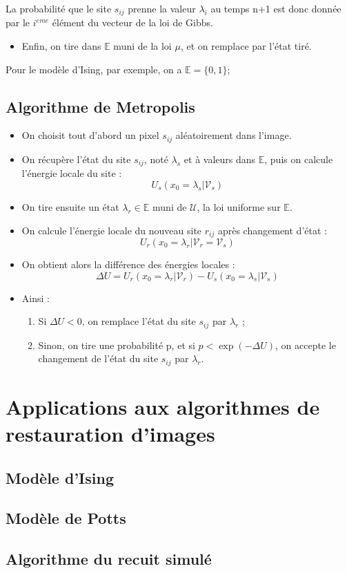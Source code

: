 \documentclass[a4paper, 12pt]{article}
\begin{document}
La probabilité que le site $s_{ij}$ prenne la valeur $\lambda_i$ au temps n+1 est donc donnée par le $i^{\grave{e}me}$ élément du vecteur de la loi de Gibbs.
\begin{itemize}
\item Enfin, on tire dans $\mathbb{E}$ muni de la loi $\mu$, et on remplace par l'état tiré.
\end{itemize}
Pour le modèle d'Ising, par exemple, on a $\mathbb{E} =\{0,1\}$;

\subsection[Algorithme de Metropolis]{Algorithme de Metropolis}
\begin{itemize}
\item On choisit tout d'abord un pixel $s_{ij} $ aléatoirement dans l'image.
\item On récupère l'état du site $s_{ij} $, noté $\lambda_s$ et à valeurs dans $\mathbb{E}$, puis on calcule l'énergie locale du site : 
\[
  U_s(x_0=\lambda_s| \mathcal{V}_s)
\]
\item On tire ensuite un état $\lambda_r \in \mathbb{E}$ muni de $\mathcal{U}$, la loi uniforme sur $\mathbb{E}$.
\item On calcule l'énergie locale du nouveau site $r_{ij}$ après changement d'état : 
\[
  U_r(x_0=\lambda_r| \mathcal{V}_r = \mathcal{V}_s) 
\]
\item On obtient alors la différence des énergies locales : 
\[
  \Delta U = U_r(x_0=\lambda_r| \mathcal{V}_r)-U_s(x_0=\lambda_s| \mathcal{V}_s)
\]
\item Ainsi : 
\begin{enumerate}
  \item Si $\Delta U < 0$, on remplace l'état du site $s_{ij}$ par $\lambda_r$ ;
  \item Sinon, on tire une probabilité p, et si $p < \exp({-\Delta U })$, on accepte le changement de l'état du site $s_{ij}$ par $\lambda_r$.
\end{enumerate}
\end{itemize}

\section{Applications aux algorithmes de restauration d'images}
\subsection[Modèle d'Ising]{Modèle d'Ising}
\subsection[Modèle de Potts]{Modèle de Potts}
\subsection[Algorithme du recuit simulé]{Algorithme du recuit simulé}
\end{document}
